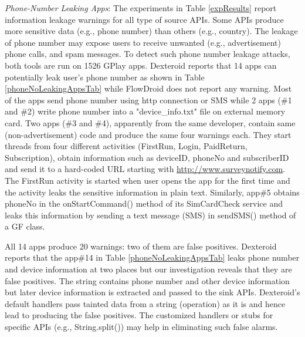 \documentclass[10pt]{elsarticle}
\begin{document}
{\noindent \emph{Phone-Number Leaking Apps}:} The experiments in Table \ref{expResults} report information leakage warnings for all type of source APIs. Some APIs produce more sensitive data (e.g., phone number) than others (e.g., country). The leakage of phone number may expose users to receive unwanted (e.g., advertisement) phone calls, and spam messages. To detect such phone number leakage attacks, both tools are run on 1526 GPlay apps. Dexteroid reports that 14 apps can potentially leak user's phone number as shown in Table \ref{phoneNoLeakingAppsTab} while FlowDroid does not report any warning. Most of the apps send phone number using {\ttfamily http} connection or SMS while 2 apps (\#1 and \#2) write phone number into a "device\_info.txt" file on external memory card. Two apps (\#3 and \#4), apparently from the same developer, contain same (non-advertisement) code and produce the same four warnings each. They start threads from four different activities ({\ttfamily FirstRun}, {\ttfamily Login}, {\ttfamily PaidReturn}, {\ttfamily Subscription}), obtain information such as deviceID, phoneNo and subscriberID and send it to a hard-coded URL starting with {\url{http://www.surveynotify.com}}. The {\ttfamily FirstRun} activity is started when user opens the app for the first time and the activity leaks the sensitive information in plain text. Similarly, app\#5 obtains phoneNo in the {\ttfamily onStartCommand()} method of its {\ttfamily SimCardCheck} service and leaks this information by sending a text message (SMS) in {\ttfamily sendSMS()} method of a {\ttfamily GF} class.

All 14 apps produce 20 warnings: two of them are false positives. Dexteroid reports that the app\#14 in Table \ref{phoneNoLeakingAppsTab} leaks phone number and device information at two places but our investigation reveals that they are false positives. The string contains phone number and other device information but later device information is extracted and passed to the sink APIs. Dexteroid's default handlers pass tainted data from a string (operation) as it is and hence lead to producing the false positives. The customized handlers or stubs for specific APIs (e.g., {\ttfamily String.split()}) may help in eliminating such false alarms.
\end{document}
